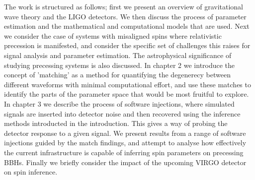 \documentclass[]{article}
\begin{document}
The work is structured as follows; first we present an overview of gravitational wave theory and the LIGO detectors. We then discuss the process of parameter estimation and the mathematical and computational models that are used. Next we consider the case of systems with misaligned spins where relativistic precession is manifested, and consider the specific set of challenges this raises for signal analysis and parameter estimation. The astrophysical significance of studying precessing systems is also discussed. In chapter 2 we introduce the concept of 'matching' as a method for quantifying the degenerecy between different waveforms with minimal computational effort, and use these matches to identify the parts of the parameter space that would be most fruitful to explore. In chapter 3 we describe the process of software injections, where simulated signals are inserted into detector noise and then recovered using the inference methods introducted in the introduction. This gives a way of probing the detector response to a given signal. We present results from a range of software injections guided by the match findings, and attempt to analyse how effectively the current infrastructure is capable of inferring spin parameters on precessing BBHs. Finally we briefly consider the impact of the upcoming VIRGO detector on spin inference.
\end{document}
